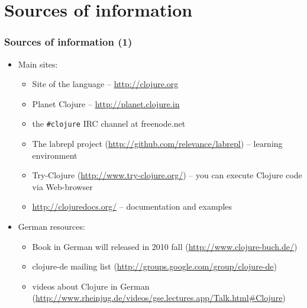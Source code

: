 \section{Sources of information}

\begin{frame}[t,fragile]
  \frametitle{Sources of information (1)}
  \begin{itemize}
  \item Main sites:
    \begin{itemize}
    \item Site of the language -- \url{http://clojure.org}
    \item Planet Clojure -- \url{http://planet.clojure.in}
    \item the \lstinline|#clojure| IRC channel at freenode.net
    \item The labrepl project (\url{http://github.com/relevance/labrepl}) -- learning
      environment
    \item Try-Clojure (\url{http://www.try-clojure.org/}) -- you can execute Clojure code via Web-browser
    \item \url{http://clojuredocs.org/} -- documentation and examples
    \end{itemize}
  \item German resources:
    \begin{itemize}
    \item Book in German will released in 2010 fall (\url{http://www.clojure-buch.de/})
    \item clojure-de mailing list (\url{http://groups.google.com/group/clojure-de})
    \item videos about Clojure in German (\url{http://www.rheinjug.de/videos/gse.lectures.app/Talk.html#Clojure})
    \end{itemize}
  \end{itemize}
\end{frame}

